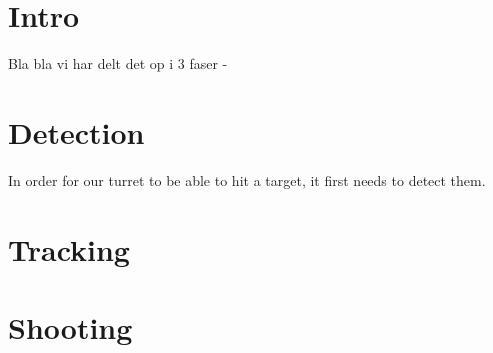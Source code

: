 \section{Intro}
Bla bla vi har delt det op i 3 faser - 
\section{Detection}
In order for our turret to be able to hit a target, it first needs to detect them. 
\section{Tracking}
\section{Shooting}
